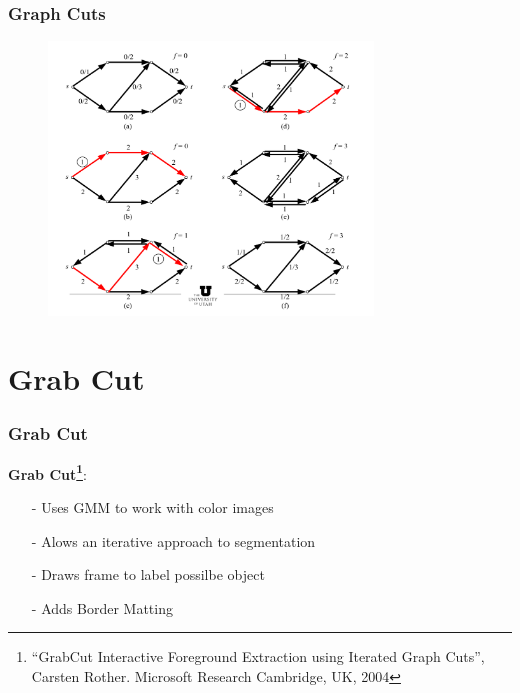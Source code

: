 \documentclass[notheorems,mathserif,table,compress]{beamer}  %
\begin{document}
\begin{frame}
\frametitle{Graph Cuts}
  \begin{figure}[!ht]
  \centering
   \includegraphics[width=3.4in]{Maxflow4.png}
   \end{figure}
\end{frame}

\section{Grab Cut}
\begin{frame}
\frametitle{Grab Cut}
\textbf{Grab Cut\footnote{``GrabCut Interactive Foreground Extraction using Iterated Graph Cuts'', Carsten Rother. Microsoft Research Cambridge, UK, 2004}}:
\begin{itemize}
\item[-] Uses {\color{blue} GMM} to work with {\color{blue} color images}
\item[-] Alows an {\color{blue} iterative} approach to segmentation
\item[-] Draws {\color{blue} frame} to label possilbe object
\item[-] Adds {\color{blue} Border Matting}
\end{itemize}
\end{frame}
\end{document}
